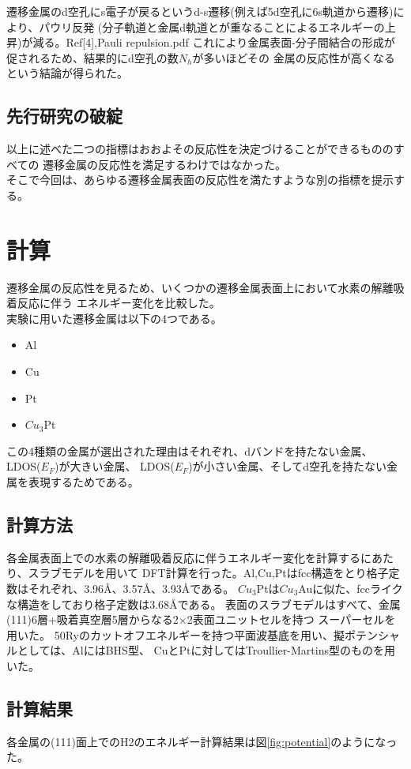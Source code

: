 \documentclass[12pt]{ltjsarticle}
\begin{document}
遷移金属のd空孔にs電子が戻るというd-s遷移(例えば5d空孔に6s軌道から遷移)により、パウリ反発
(分子軌道と金属d軌道とが重なることによるエネルギーの上昇)が減る。Ref[4],Pauli repulsion.pdf
これにより金属表面-分子間結合の形成が促されるため、結果的にd空孔の数$N_h$が多いほどその
金属の反応性が高くなるという結論が得られた。

\subsection{先行研究の破綻}
以上に述べた二つの指標はおおよその反応性を決定づけることができるもののすべての
遷移金属の反応性を満足するわけではなかった。\\
そこで今回は、あらゆる遷移金属表面の反応性を満たすような別の指標を提示する。

\section{計算}
遷移金属の反応性を見るため、いくつかの遷移金属表面上において水素の解離吸着反応に伴う
エネルギー変化を比較した。\\
実験に用いた遷移金属は以下の4つである。

\begin{itemize}
 \item Al
 \item Cu
 \item Pt
 \item $Cu_{3}$Pt
\end{itemize}

この4種類の金属が選出された理由はそれぞれ、dバンドを持たない金属、LDOS($E_F$)が大きい金属、
LDOS($E_F$)が小さい金属、そしてd空孔を持たない金属を表現するためである。

\subsection{計算方法}
各金属表面上での水素の解離吸着反応に伴うエネルギー変化を計算するにあたり、スラブモデルを用いて
DFT計算を行った。Al,Cu,Ptはfcc構造をとり格子定数はそれぞれ、3.96$\mbox{\AA}$、3.57$\mbox{\AA}$、3.93$\mbox{\AA}$である。
$Cu_3$Ptは$Cu_3$Auに似た、fccライクな構造をしており格子定数は3.68$\mbox{\AA}$である。
表面のスラブモデルはすべて、金属(111)6層+吸着真空層5層からなる2×2表面ユニットセルを持つ
スーパーセルを用いた。
50Ryのカットオフエネルギーを持つ平面波基底を用い、擬ポテンシャルとしては、AlにはBHS型、
CuとPtに対してはTroullier-Martins型のものを用いた。

\subsection{計算結果}
各金属の(111)面上でのH2のエネルギー計算結果は図\ref{fig:potential}のようになった。\\
\end{document}
